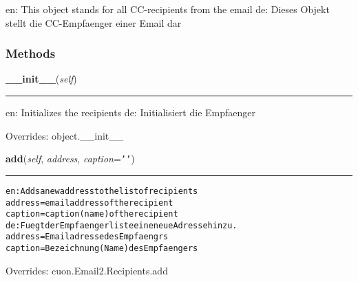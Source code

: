 en: This object stands for all CC-recipients from the email de: Dieses 
Objekt stellt die CC-Empfaenger einer Email dar



  \subsubsection{Methods}

    \vspace{0.5ex}

\hspace{.8\funcindent}\begin{boxedminipage}{\funcwidth}

    \raggedright \textbf{\_\_init\_\_}(\textit{self})

    \vspace{-1.5ex}

    \rule{\textwidth}{0.5\fboxrule}
\setlength{\parskip}{2ex}
    en: Initializes the recipients de: Initialisiert die Empfaenger

\setlength{\parskip}{1ex}
      Overrides: object.\_\_init\_\_

    \end{boxedminipage}

    \vspace{0.5ex}

\hspace{.8\funcindent}\begin{boxedminipage}{\funcwidth}

    \raggedright \textbf{add}(\textit{self}, \textit{address}, \textit{caption}={\tt \texttt{'}\texttt{}\texttt{'}})

    \vspace{-1.5ex}

    \rule{\textwidth}{0.5\fboxrule}
\setlength{\parskip}{2ex}
\begin{alltt}

en: Adds a new address to the list of recipients
    address = email address of the recipient
    caption = caption (name) of the recipient
de: Fuegt der Empfaengerliste eine neue Adresse hinzu.
    address = Emailadresse des Empfaengrs
    caption = Bezeichnung (Name) des Empfaengers
\end{alltt}

\setlength{\parskip}{1ex}
      Overrides: cuon.Email2.Recipients.add

    \end{boxedminipage}

